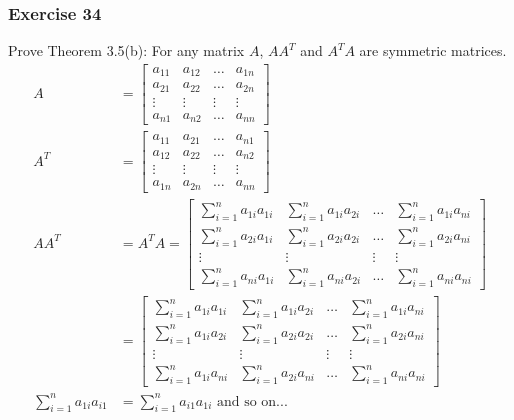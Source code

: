 \documentclass[letterpaper, 12pt]{math}
\begin{document}
\subsubsection*{Exercise 34}
Prove Theorem 3.5(b): For any matrix \( A \), \( AA^T \) and \( A^TA \) are
symmetric matrices.
\begin{align*}
  A &= \begin{bmatrix}
    a_{11} & a_{12} & \dots & a_{1n} \\
    a_{21} & a_{22} & \dots & a_{2n} \\
    \vdots & \vdots & \vdots & \vdots \\
    a_{n1} & a_{n2} & \dots & a_{nn}
  \end{bmatrix} \\
  A^T &= \begin{bmatrix}
    a_{11} & a_{21} & \dots & a_{n1} \\
    a_{12} & a_{22} & \dots & a_{n2} \\
    \vdots & \vdots & \vdots & \vdots \\
    a_{1n} & a_{2n} & \dots & a_{nn}
  \end{bmatrix} \\
  AA^T &= A^TA = \begin{bmatrix}
    \sum_{i=1}^{n}a_{1i}a_{1i} & \sum_{i=1}^{n}a_{1i}a_{2i} & \dots &
      \sum_{i=1}^{n}a_{1i}a_{ni} \\[1em]
    \sum_{i=1}^{n}a_{2i}a_{1i} & \sum_{i=1}^{n}a_{2i}a_{2i} & \dots &
      \sum_{i=1}^{n}a_{2i}a_{ni} \\[1em]
    \vdots & \vdots & \vdots & \vdots \\[1em]
    \sum_{i=1}^{n}a_{ni}a_{1i} & \sum_{i=1}^{n}a_{ni}a_{2i} & \dots &
      \sum_{i=1}^{n}a_{ni}a_{ni}
  \end{bmatrix} \\
  &= \begin{bmatrix}
    \sum_{i=1}^{n}a_{1i}a_{1i} & \sum_{i=1}^{n}a_{1i}a_{2i} & \dots &
      \sum_{i=1}^{n}a_{1i}a_{ni} \\[1em]
    \sum_{i=1}^{n}a_{1i}a_{2i} & \sum_{i=1}^{n}a_{2i}a_{2i} & \dots &
      \sum_{i=1}^{n}a_{2i}a_{ni} \\[1em]
    \vdots & \vdots & \vdots & \vdots \\[1em]
    \sum_{i=1}^{n}a_{1i}a_{ni} & \sum_{i=1}^{n}a_{2i}a_{ni} & \dots &
      \sum_{i=1}^{n}a_{ni}a_{ni}
  \end{bmatrix} \\
  \sum_{i=1}^{n}a_{1i}a_{i1} &= \sum_{i=1}^{n}a_{i1}a_{1i} \text{ and so on...}
\end{align*}
\end{document}
